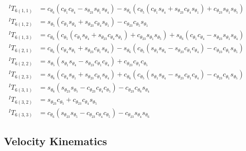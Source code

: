 \documentclass[12pt]{report}
\begin{document}
\[
\begin{aligned}
^IT_{6(1,1)} &=
c_{\theta_6}(c_{\theta_1}c_{\theta_4} - s_{\theta_{23}}s_{\theta_1}s_{\theta_4}) - s_{\theta_6}(c_{\theta_5}(c_{\theta_1}s_{\theta_4} + s_{\theta_{23}}c_{\theta_4}s_{\theta_1}) + c_{\theta_{23}}s_{\theta_1}s_{\theta_5})\\
^IT_{6(1,2)} &=
s_{\theta_5}(c_{\theta_1}s_{\theta_4} + s_{\theta_{23}}c_{\theta_4}s_{\theta_1}) - c_{\theta_{23}}c_{\theta_5}s_{\theta_1}\\
^IT_{6(1,3)} &=
c_{\theta_6}(c_{\theta_5}(c_{\theta_1}s_{\theta_4} + s_{\theta_{23}}c_{\theta_4}s_{\theta_1}) + c_{\theta_{23}}s_{\theta_1}s_{\theta_5}) + s_{\theta_6}(c_{\theta_1}c_{\theta_4} - s_{\theta_{23}}s_{\theta_1}s_{\theta_4})\\
^IT_{6(2,1)} &=
c_{\theta_6}(c_{\theta_4}s_{\theta_1} + s_{\theta_{23}}c_{\theta_1}s_{\theta_4}) - s_{\theta_6}(c_{\theta_5}(s_{\theta_1}s_{\theta_4} - s_{\theta_{23}}c_{\theta_1}c_{\theta_4}) - c_{\theta_{23}}c_{\theta_1}s_{\theta_5})\\
^IT_{6(2,2)} &=
s_{\theta_5}(s_{\theta_1}s_{\theta_4} - s_{\theta_{23}}c_{\theta_1}c_{\theta_4}) + c_{\theta_{23}}c_{\theta_1}c_{\theta_5}\\
^IT_{6(2,3)} &=
s_{\theta_6}(c_{\theta_4}s_{\theta_1} + s_{\theta_{23}}c_{\theta_1}s_{\theta_4}) + c_{\theta_6}(c_{\theta_5}(s_{\theta_1}s_{\theta_4} - s_{\theta_{23}}c_{\theta_1}c_{\theta_4}) - c_{\theta_{23}}c_{\theta_1}s_{\theta_5})\\
^IT_{6(3,1)} &=
s_{\theta_6}(s_{\theta_{23}}s_{\theta_5} - c_{\theta_{23}}c_{\theta_4}c_{\theta_5}) - c_{\theta_{23}}c_{\theta_6}s_{\theta_4}\\
^IT_{6(3,2)} &=
s_{\theta_{23}}c_{\theta_5} + c_{\theta_{23}}c_{\theta_4}s_{\theta_5}\\
^IT_{6(3,3)} &=
c_{\theta_6}(s_{\theta_{23}}s_{\theta_5} - c_{\theta_{23}}c_{\theta_4}c_{\theta_5}) - c_{\theta_{23}}s_{\theta_4}s_{\theta_6}
\end{aligned}
\]
\newpage
\subsection{Velocity Kinematics}
\end{document}
